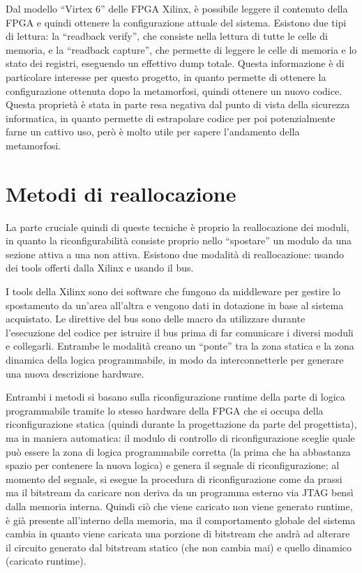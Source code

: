 \documentclass[a4paper,titlepage]{book}
\begin{document}
Dal modello ``Virtex 6'' delle FPGA Xilinx, è possibile leggere il contenuto della FPGA e quindi ottenere la configurazione attuale del sistema. Esistono due tipi di lettura: la ``readback verify'', che consiste nella lettura di tutte le celle di memoria, e la ``readback capture'', che permette di leggere le celle di memoria e lo stato dei registri, eseguendo un effettivo dump totale. Questa informazione è di particolare interesse per questo progetto, in quanto permette di ottenere la configurazione ottenuta dopo la metamorfosi, quindi ottenere un nuovo codice. Questa proprietà è stata in parte resa negativa dal punto di vista della sicurezza informatica, in quanto permette di estrapolare codice per poi potenzialmente farne un cattivo uso, però è molto utile per sapere l'andamento della metamorfosi.

\section{Metodi di reallocazione}

La parte cruciale quindi di queste tecniche è proprio la reallocazione dei moduli, in quanto la riconfigurabilità consiste proprio nello ``spostare'' un modulo da una sezione attiva a una non attiva. Esistono due modalità di reallocazione: usando dei tools offerti dalla Xilinx e usando il bus.

I tools della Xilinx sono dei software che fungono da middleware per gestire lo spostamento da un'area all'altra e vengono dati in dotazione in base al sistema acquistato. Le direttive del bus sono delle macro da utilizzare durante l'esecuzione del codice per istruire il bus prima di far comunicare i diversi moduli e collegarli. Entrambe le modalità creano un ``ponte'' tra la zona statica e la zona dinamica della logica programmabile, in modo da interconnetterle per generare una nuova descrizione hardware.

Entrambi i metodi si basano sulla riconfigurazione runtime della parte di logica programmabile tramite lo stesso hardware della FPGA che si occupa della riconfigurazione statica (quindi durante la progettazione da parte del progettista), ma in maniera automatica: il modulo di controllo di riconfigurazione sceglie quale può essere la zona di logica programmabile corretta (la prima che ha abbastanza spazio per contenere la nuova logica) e genera il segnale di riconfigurazione; al momento del segnale, si esegue la procedura di riconfigurazione come da prassi ma il bitstream da caricare non deriva da un programma esterno via JTAG bensì dalla memoria interna. Quindi ciò che viene caricato non viene generato runtime, è già presente all'interno della memoria, ma il comportamento globale del sistema cambia in quanto viene caricata una porzione di bitstream che andrà ad alterare il circuito generato dal bitstream statico (che non cambia mai) e quello dinamico (caricato runtime).
\end{document}
